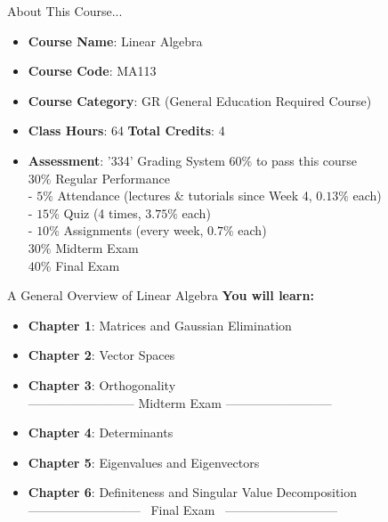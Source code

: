 \documentclass{beamer}
\begin{document}
\begin{frame}{About This Course...}
\begin{itemize}
    \item \textbf{Course Name}: Linear Algebra
    \item \textbf{Course Code}: MA113
    \item \textbf{Course Category}: GR (General Education Required Course)
    \item \textbf{Class Hours}: 64 \qquad \textbf{Total Credits}: 4
    \item \textbf{Assessment}: '334' Grading System \quad $60\%$ to pass this course\\
        \vspace{5pt}
        $30\%$ Regular Performance\\
        \vspace{3pt}
        \quad - $5\%$ Attendance (lectures \& tutorials since Week 4, $0.13\%$ each)\\
        \vspace{3pt}
        \quad - $15\%$ Quiz (4 times, $3.75\%$ each)\\
        \vspace{3pt}
        \quad - $10\%$ Assignments (every week, $0.7\%$ each)\\
        \vspace{3pt}
        $30\%$ Midterm Exam \\
        \vspace{3pt}
        $40\%$ Final Exam
\end{itemize}

\end{frame}
\begin{frame}{A General Overview of Linear Algebra}
\textbf{You will learn:}
\begin{itemize}
    \item \textbf{Chapter 1}: Matrices and Gaussian Elimination
    \item \textbf{Chapter 2}: Vector Spaces
    \item \textbf{Chapter 3}: Orthogonality\\
    \vspace{4pt}
-------------------------- Midterm Exam --------------------------
    \item \textbf{Chapter 4}: Determinants
    \item \textbf{Chapter 5}: Eigenvalues and Eigenvectors
    \item \textbf{Chapter 6}: Definiteness and Singular Value Decomposition
    \\
    \vspace{4pt}
--------------------------- \ Final Exam \ ---------------------------
\end{itemize}
\end{frame}
\end{document}
